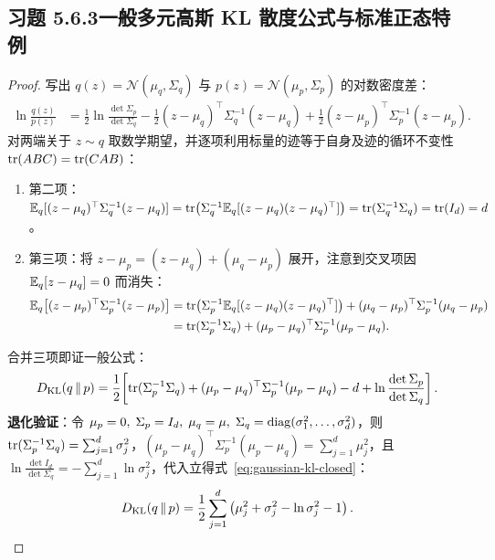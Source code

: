 \subsection*{习题 5.6.3\quad 一般多元高斯 KL 散度公式与标准正态特例}
\begin{proof}
写出 $q(z) = \mathcal{N}(\mu_q, \Sigma_q)$ 与 $p(z) = \mathcal{N}(\mu_p, \Sigma_p)$ 的对数密度差：
\begin{align*}
  \ln \frac{q(z)}{p(z)}
  &= \frac{1}{2}\ln\frac{\det \Sigma_p}{\det \Sigma_q}
   - \frac{1}{2}(z - \mu_q)^\top \Sigma_q^{-1}(z - \mu_q)
   + \frac{1}{2}(z - \mu_p)^\top \Sigma_p^{-1}(z - \mu_p).
\end{align*}
对两端关于 $z \sim q$ 取数学期望，并逐项利用标量的迹等于自身及迹的循环不变性 $\operatorname{tr}(ABC) = \operatorname{tr}(CAB)$：
\begin{enumerate}[label=(\arabic*), leftmargin=1.8em]
  \item 第二项：$\mathbb{E}_q[(z - \mu_q)^\top \Sigma_q^{-1}(z - \mu_q)] = \operatorname{tr}\!\big(\Sigma_q^{-1}\mathbb{E}_q[(z - \mu_q)(z - \mu_q)^\top]\big) = \operatorname{tr}(\Sigma_q^{-1}\Sigma_q) = \operatorname{tr}(I_d) = d$。
  \item 第三项：将 $z - \mu_p = (z - \mu_q) + (\mu_q - \mu_p)$ 展开，注意到交叉项因 $\mathbb{E}_q[z - \mu_q] = 0$ 而消失：
  \begin{align*}
    \mathbb{E}_q\big[(z - \mu_p)^\top \Sigma_p^{-1}(z - \mu_p)\big]
    &= \operatorname{tr}\!\big(\Sigma_p^{-1}\mathbb{E}_q[(z - \mu_q)(z - \mu_q)^\top]\big) + (\mu_q - \mu_p)^\top \Sigma_p^{-1}(\mu_q - \mu_p) \\
    &= \operatorname{tr}(\Sigma_p^{-1}\Sigma_q) + (\mu_p - \mu_q)^\top \Sigma_p^{-1}(\mu_p - \mu_q).
  \end{align*}
\end{enumerate}
合并三项即证一般公式：
\[
  D_{\mathrm{KL}}(q \,\|\, p) = \frac{1}{2}\!\left[\operatorname{tr}(\Sigma_p^{-1}\Sigma_q) + (\mu_p - \mu_q)^\top \Sigma_p^{-1}(\mu_p - \mu_q) - d + \ln\frac{\det \Sigma_p}{\det \Sigma_q}\right].
\]
\textbf{退化验证}：令 $\mu_p = 0,\; \Sigma_p = I_d,\; \mu_q = \mu,\; \Sigma_q = \operatorname{diag}(\sigma_1^2, \dots, \sigma_d^2)$，则 $\operatorname{tr}(\Sigma_p^{-1}\Sigma_q) = \sum_{j=1}^d \sigma_j^2$，$(\mu_p - \mu_q)^\top \Sigma_p^{-1}(\mu_p - \mu_q) = \sum_{j=1}^d \mu_j^2$，且 $\ln\frac{\det I_d}{\det \Sigma_q} = -\sum_{j=1}^d \ln \sigma_j^2$，代入立得式~\eqref{eq:gaussian-kl-closed}：
\[
  D_{\mathrm{KL}}(q \,\|\, p) = \frac{1}{2}\sum_{j=1}^d \left(\mu_j^2 + \sigma_j^2 - \ln \sigma_j^2 - 1\right).
\]
\end{proof}

